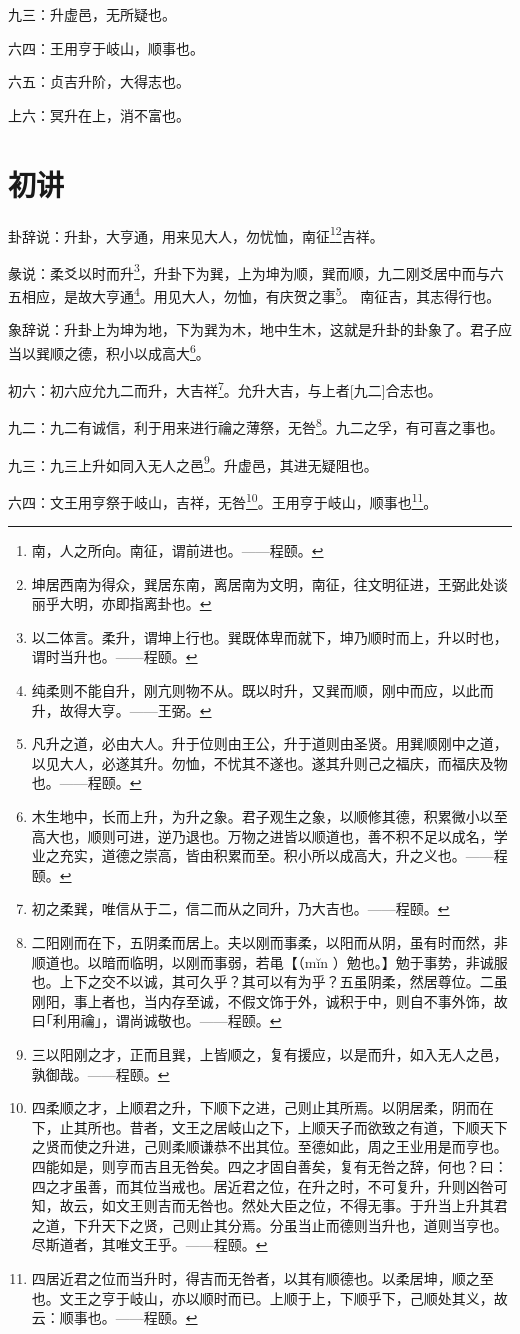 \documentclass[12pt,oneside]{book}
\begin{document}
九三：升虚邑，无所疑也。

六四：王用亨于岐山，顺事也。

六五：贞吉升阶，大得志也。

上六：冥升在上，消不富也。

\section{初讲}
卦辞说：升卦，大亨通，用来见大人，勿忧恤，南征\footnote{南，人之所向。南征，谓前进也。——程颐。}\footnote{坤居西南为得众，巽居东南，离居南为文明，南征，往文明征进，王弼此处谈丽乎大明，亦即指离卦也。}吉祥。

彖说：柔爻以时而升\footnote{以二体言。柔升，谓坤上行也。巽既体卑而就下，坤乃顺时而上，升以时也，谓时当升也。——程颐。}，升卦下为巽，上为坤为顺，巽而顺，九二刚爻居中而与六五相应，是故大亨通\footnote{纯柔则不能自升，刚亢则物不从。既以时升，又巽而顺，刚中而应，以此而升，故得大亨。——王弼。}。用见大人，勿恤，有庆贺之事\footnote{凡升之道，必由大人。升于位则由王公，升于道则由圣贤。用巽顺刚中之道，以见大人，必遂其升。勿恤，不忧其不遂也。遂其升则己之福庆，而福庆及物也。——程颐。 }。 南征吉，其志得行也。

象辞说：升卦上为坤为地，下为巽为木，地中生木，这就是升卦的卦象了。君子应当以巽顺之德，积小以成高大\footnote{木生地中，长而上升，为升之象。君子观生之象，以顺修其德，积累微小以至高大也，顺则可进，逆乃退也。万物之进皆以顺道也，善不积不足以成名，学业之充实，道德之崇高，皆由积累而至。积小所以成高大，升之义也。——程颐。}。

初六：初六应允九二而升，大吉祥\footnote{初之柔巽，唯信从于二，信二而从之同升，乃大吉也。——程颐。}。允升大吉，与上者[九二]合志也。

九二：九二有诚信，利于用来进行禴之薄祭，无咎\footnote{二阳刚而在下，五阴柔而居上。夫以刚而事柔，以阳而从阴，虽有时而然，非顺道也。以暗而临明，以刚而事弱，若黾【（mĭn ）勉也。】勉于事势，非诚服也。上下之交不以诚，其可久乎？其可以有为乎？五虽阴柔，然居尊位。二虽刚阳，事上者也，当内存至诚，不假文饰于外，诚积于中，则自不事外饰，故曰｢利用禴｣，谓尚诚敬也。——程颐。}。九二之孚，有可喜之事也。

九三：九三上升如同入无人之邑\footnote{三以阳刚之才，正而且巽，上皆顺之，复有援应，以是而升，如入无人之邑，孰御哉。——程颐。}。升虚邑，其进无疑阻也。

六四：文王用亨祭于岐山，吉祥，无咎\footnote{四柔顺之才，上顺君之升，下顺下之进，己则止其所焉。以阴居柔，阴而在下，止其所也。昔者，文王之居岐山之下，上顺天子而欲致之有道，下顺天下之贤而使之升进，己则柔顺谦恭不出其位。至德如此，周之王业用是而亨也。四能如是，则亨而吉且无咎矣。四之才固自善矣，复有无咎之辞，何也？曰：四之才虽善，而其位当戒也。居近君之位，在升之时，不可复升，升则凶咎可知，故云，如文王则吉而无咎也。然处大臣之位，不得无事。于升当上升其君之道，下升天下之贤，己则止其分焉。分虽当止而德则当升也，道则当亨也。尽斯道者，其唯文王乎。——程颐。}。王用亨于岐山，顺事也\footnote{四居近君之位而当升时，得吉而无咎者，以其有顺德也。以柔居坤，顺之至也。文王之亨于岐山，亦以顺时而已。上顺于上，下顺乎下，己顺处其义，故云：顺事也。——程颐。}。
\end{document}
